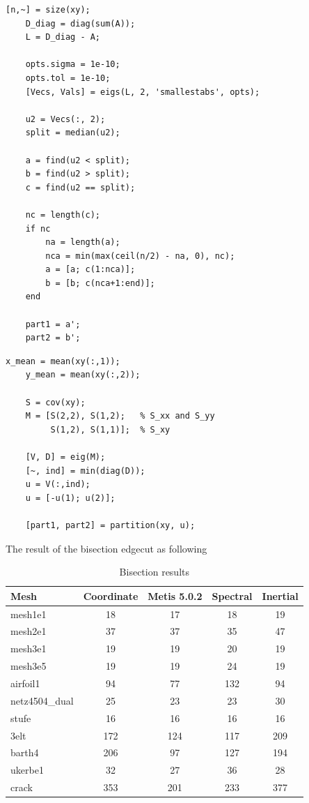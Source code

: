 \documentclass[unicode,11pt,a4paper,oneside,numbers=endperiod,openany]{scrartcl}
\begin{document}
\begin{lstlisting}[language=MyMATLAB, style=mystyle, caption={Spectral Clustering and Bipartition}]
    [n,~] = size(xy);
    D_diag = diag(sum(A));
    L = D_diag - A;
    
    opts.sigma = 1e-10;
    opts.tol = 1e-10;
    [Vecs, Vals] = eigs(L, 2, 'smallestabs', opts);
    
    u2 = Vecs(:, 2);
    split = median(u2);
    
    a = find(u2 < split);
    b = find(u2 > split);
    c = find(u2 == split);
    
    nc = length(c);
    if nc
        na = length(a);
        nca = min(max(ceil(n/2) - na, 0), nc);
        a = [a; c(1:nca)];
        b = [b; c(nca+1:end)];
    end
    
    part1 = a';
    part2 = b';
\end{lstlisting}

\begin{lstlisting}[language=MyMATLAB, style=mystyle, caption={Computing Principal Direction and Partitioning Data}]
    x_mean = mean(xy(:,1));
    y_mean = mean(xy(:,2));
    
    S = cov(xy);           
    M = [S(2,2), S(1,2);   % S_xx and S_yy
         S(1,2), S(1,1)];  % S_xy
    
    [V, D] = eig(M);
    [~, ind] = min(diag(D));
    u = V(:,ind);
    u = [-u(1); u(2)];
    
    [part1, part2] = partition(xy, u);
\end{lstlisting}
The result of the bisection edgecut as following
\begin{table}[htbp]
    \centering
    \caption{Bisection results}
    \label{tab:bisection_results}
    \begin{tabular}{lcccc}
        \toprule
        \textbf{Mesh} & \textbf{Coordinate} & \textbf{Metis 5.0.2} & \textbf{Spectral} & \textbf{Inertial} \\
        \midrule
        mesh1e1          & 18  & 17  & 18  & 19  \\
        mesh2e1          & 37  & 37  & 35  & 47  \\
        mesh3e1          & 19  & 19  & 20  & 19  \\
        mesh3e5          & 19  & 19  & 24  & 19  \\
        airfoil1         & 94  & 77  & 132 & 94  \\
        netz4504\_dual   & 25  & 23  & 23  & 30  \\
        stufe            & 16  & 16  & 16  & 16  \\
        3elt             & 172 & 124 & 117 & 209 \\
        barth4           & 206 & 97  & 127 & 194 \\
        ukerbe1          & 32  & 27  & 36  & 28  \\
        crack            & 353 & 201 & 233 & 377 \\
        \bottomrule
    \end{tabular}
\end{table}
\end{document}
